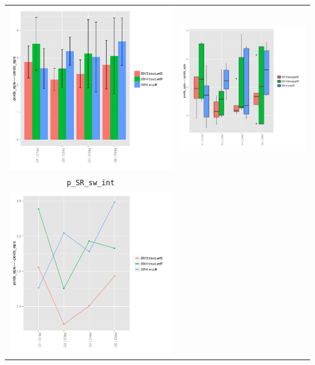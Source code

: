 \documentclass{article}\usepackage[]{graphicx}\usepackage[]{color}
\newenvironment{knitrout}{}{} %
\begin{document}
\begin{itemize}
\begin{center}
\begin{tabular}{cc}
\begin{knitrout}
{\centering \includegraphics[width=.4\textwidth]{figures/shinemas2R_unnamed-chunk-100-1} 

}



\end{knitrout}
&
\begin{knitrout}
\definecolor{shadecolor}{rgb}{0.969, 0.969, 0.969}\color{fgcolor}

{\centering \includegraphics[width=.4\textwidth]{figures/shinemas2R_unnamed-chunk-101-1} 

}



\end{knitrout}
\\
\texttt{p\_SR\_sw\_int} & \\
\begin{knitrout}
\definecolor{shadecolor}{rgb}{0.969, 0.969, 0.969}\color{fgcolor}

{\centering \includegraphics[width=.4\textwidth]{figures/shinemas2R_unnamed-chunk-102-1} 

}
\end{knitrout}
\end{tabular}
\end{center}
\end{itemize}
\end{document}
